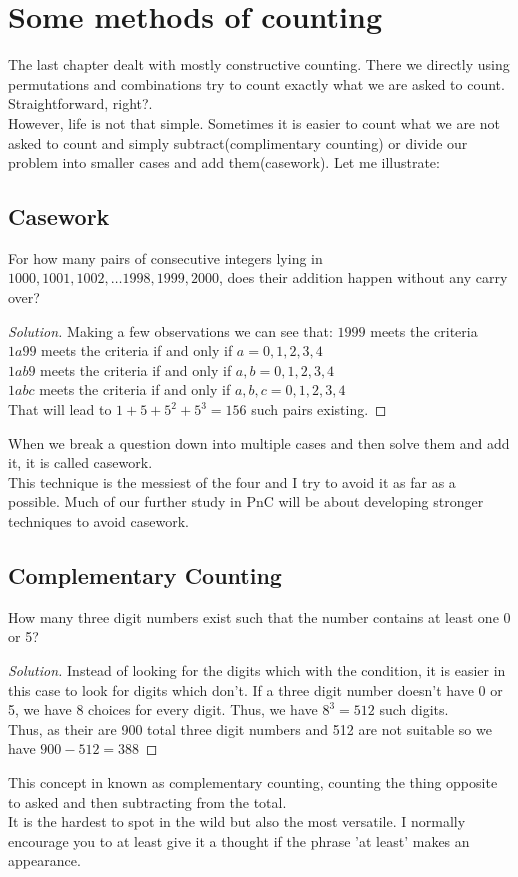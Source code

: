 \chapter{Some methods of counting}
The last chapter dealt with mostly constructive counting. There we directly using permutations and combinations try to count exactly what we are asked to count. Straightforward, right?.\\
However, life is not that simple. Sometimes it is easier to count what we are not asked to count and simply subtract(complimentary counting) or divide our problem into smaller cases and add them(casework). Let me illustrate:
\section{Casework}
\begin{example}
    For how many pairs of consecutive integers lying in {$1000, 1001, 1002, \dots 1998, 1999, 2000$}, does their addition happen without any carry over?
\end{example}
\begin{proof}
    [Solution]
    Making a few observations we can see that: 
    $1999$ meets the criteria\\
    $1a99$ meets the criteria if and only if $a=0,1,2,3,4$\\
    $1ab9$ meets the criteria if and only if $a,b=0,1,2,3,4$\\
    $1abc$ meets the criteria if and only if $a,b,c=0,1,2,3,4$\\
    That will lead to $1+5+5^2+5^3=156$ such pairs existing.
\end{proof}
When we break a question down into multiple cases and then solve them and add it, it is called casework.\\
This technique is the messiest of the four and I try to avoid it as far as a possible. Much of our further study in PnC will be about developing stronger techniques to avoid casework.
\section{Complementary Counting}
\begin{example}
     How many three digit numbers exist such that the number contains at least one 0 or 5?
\end{example}
\begin{proof}
    [Solution]
    Instead of looking for the digits which with the condition, it is easier in this case to look for digits which don't. If a three digit number doesn't have 0 or 5, we have 8 choices for every digit. Thus, we have $8^3=512$ such digits.\\
    Thus, as their are 900 total three digit numbers and 512 are not suitable so we have $900-512=388$
\end{proof}
This concept in known as complementary counting, counting the thing opposite to asked and then subtracting from the total. \\
It is the hardest to spot in the wild but also the most versatile. I normally encourage you to at least give it a thought if the phrase 'at least' makes an appearance.
